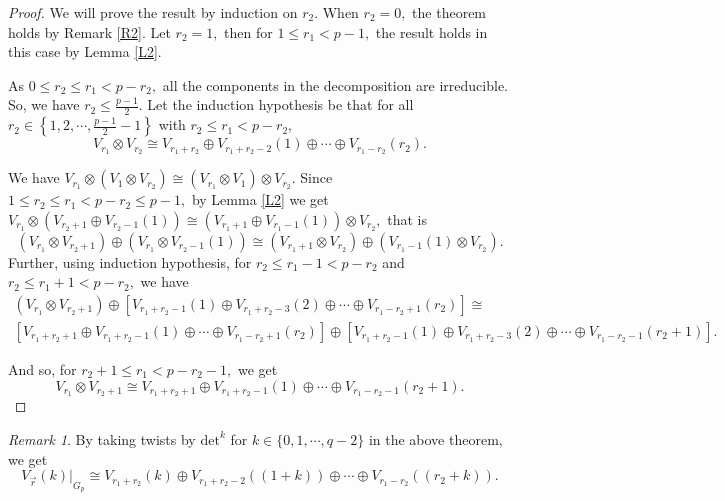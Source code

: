 \documentclass[10pt, reqno]{amsart}
\def\Gp{{G_p}}
\numberwithin{equation}{section}
\theoremstyle{remark}
\newtheorem{remark}{Remark}
\begin{document}
	\begin{proof}
		We will prove the result by induction on $r_2.$ When $r_2=0,$ the theorem holds by Remark \ref{R2}.
		Let $r_2=1,$ then for $1\leq r_1<p-1,$ the result holds in this case by Lemma \ref{L2}.
		
		As $0\leq r_2\leq r_1<p-r_2,$ all the components in the decomposition are irreducible. So, we have $r_2\leq \frac{p-1}{2}.$ Let the induction hypothesis be that for all $r_2\in\left\{1,2,\cdots,\frac{p-1}{2}-1\right\}$ with $r_2\leq r_1<p-r_2,$ 
		$$V_{r_1}\otimes V_{r_2}\cong V_{r_1+r_2}\oplus V_{r_1+r_2-2}(1)\oplus\cdots\oplus V_{r_1-r_2}(r_2).$$
		
		We have $V_{r_1}\otimes (V_1\otimes V_{r_2})\cong (V_{r_1}\otimes V_1)\otimes V_{r_2}.$
		Since $1\leq r_2\leq r_1<p-r_2\leq p-1,$ by Lemma \ref{L2} we get $V_{r_1}\otimes (V_{r_2+1}\oplus V_{r_2-1}(1))\cong (V_{r_1+1}\oplus V_{r_1-1}(1))\otimes V_{r_2},$ that is $$(V_{r_1}\otimes V_{r_2+1})\oplus (V_{r_1}\otimes V_{r_2-1}(1))\cong (V_{r_1+1}\otimes V_{r_2})\oplus (V_{r_1-1}(1)\otimes V_{r_2}).$$
		Further, using induction hypothesis, for $r_2\leq r_1-1<p-r_2$ and $r_2\leq r_1+1<p-r_2,$ we have
		\begin{multline*}
			(V_{r_1}\otimes V_{r_2+1})\oplus [V_{r_1+r_2-1}(1)\oplus V_{r_1+r_2-3}(2)\oplus\cdots\oplus V_{r_1-r_2+1}(r_2)]\cong\\
            [V_{r_1+r_2+1}\oplus V_{r_1+r_2-1}(1)\oplus \cdots \oplus V_{r_1-r_2+1}(r_2)]\oplus[V_{r_1+r_2-1}(1)\oplus V_{r_1+r_2-3}(2)\oplus \cdots \oplus V_{r_1-r_2-1}(r_2+1)].
		\end{multline*}
		
		And so, for $r_2+1\leq r_1<p-r_2-1,$ we get
		$$V_{r_1}\otimes V_{r_2+1}\cong V_{r_1+r_2+1}\oplus V_{r_1+r_2-1}(1)\oplus \cdots\oplus V_{r_1-r_2-1}(r_2+1).$$
	\end{proof}

\begin{remark}\label{R3}
	By taking twists by $\mathrm{det}^k$ for $k\in \{0,1,\cdots, q-2\}$ in the above theorem, we get $${V_{\vec{r}}(k)|}_{\Gp}\cong V_{r_1+r_2}(k)\oplus V_{r_1+r_2-2}((1+k))\oplus\cdots\oplus V_{r_1-r_2}((r_2+k)).$$
	\end{remark}
	
\end{document}
